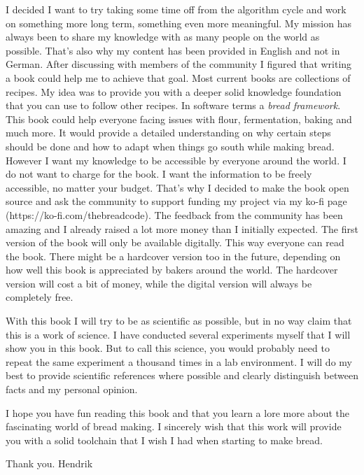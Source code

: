 I decided I want to try taking some time off from the algorithm cycle and
work on something more long term, something even more meaningful.
My mission has always been to share my knowledge with as many people
on the world as possible. That's also why my content has been provided
in English and not in German. After discussing with members of the community
I figured that writing a book could help me to achieve that goal. Most
current books are collections of recipes. My idea was to provide you
with a deeper solid knowledge foundation that you can use to follow other recipes.
In software terms a {\it bread framework}. This book could help everyone
facing issues with flour, fermentation, baking and much more. It would provide
a detailed understanding on why certain steps should be done and how to
adapt when things go south while making bread.  However
I want my knowledge to be accessible by everyone around the world. I do
not want to charge for the book. I want the information to be freely accessible,
no matter your budget. That's why I decided to make the book open source
and ask the community to support funding my project via my ko-fi page
(https://ko-fi.com/thebreadcode).
The feedback from the community has been amazing and I already raised a lot more money than
I initially expected. The first version of the book will only be available
digitally. This way everyone can read the book. There might be a hardcover
version too in the future, depending on how well this book is appreciated
by bakers around the world. The hardcover version will cost a bit of money,
while the digital version will always be completely free.

With this book I will try to be as scientific as possible, but in no way
claim that this is a work of science. I have conducted several experiments
myself that I will show you in this book. But to call this science, you would
probably need to repeat the same experiment a thousand times in a lab
environment. I will do my best to provide scientific references where possible
and clearly distinguish between facts and my personal opinion.

I hope you have fun reading this book and that you learn a lore more about
the fascinating world of bread making. I sincerely wish that this work
will provide you with a solid toolchain that I wish I had when starting
to make bread.

Thank you.
Hendrik